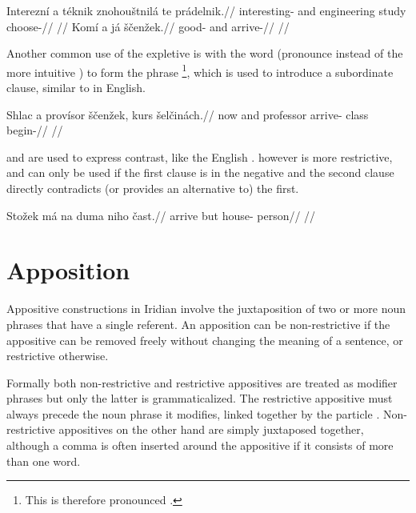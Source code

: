\pex
\a\begingl
    \gla Interezní a téknik znohouštnilá te prádelnik.//
    \glb interesting- and engineering study  choose-//
    \glft {}//
\endgl
\xe
\pex
\a\begingl
    \gla Komí a já ščenžek.//
    \glb good- and  arrive-//
    \glft {}//
\endgl
\xe

Another common use of the expletive  is with the word  (pronounce  instead of the more intuitive ) to form the phrase \footnote{This is therefore pronounced .}, which is used to introduce a subordinate clause, similar to  in English.

\pex
\a\begingl
    \gla Shlac a provísor ščenžek, kurs šelčinách.//
    \glb now and professor arrive- class begin-//
    \glft {}//
\endgl
\xe


 and  are used to express contrast, like the English .  however is more restrictive, and can only be used if the first clause is in the negative and the second clause directly contradicts (or provides an alternative to) the first.

\pex
\begingl
\gla Stožek má na duma niho čast.//
\glb arrive but  house-  person//
\glft {}//
\endgl
\xe

\section{Apposition}\label{sec:apposition}

Appositive constructions in Iridian involve the juxtaposition of two or more noun phrases that have a single referent. An apposition can be non-restrictive if the appositive can be removed freely without changing the meaning of a sentence, or restrictive otherwise.

Formally both non-restrictive and restrictive appositives are treated as modifier phrases but only the latter is grammaticalized. The restrictive appositive must always precede the noun phrase it modifies, linked together by the particle . Non-restrictive appositives on the other hand are simply juxtaposed together, although a comma is often inserted around the appositive if it consists of more than one word.

